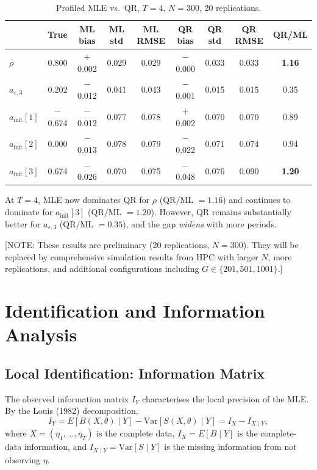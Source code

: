 \documentclass[12pt]{article}
\begin{document}
\begin{table}[H]
\centering
\caption{Profiled MLE vs.\ QR, $T = 4$, $N = 300$, 20 replications.}
\label{tab:profiled_T4}
\begin{tabular}{lcccccccc}
\toprule
 & True & ML bias & ML std & ML RMSE & QR bias & QR std & QR RMSE & QR/ML \\
\midrule
$\rho$       & 0.800 & $+$0.002 & 0.029 & 0.029 & $-$0.000 & 0.033 & 0.033 & \textbf{1.16} \\
$a_{\varepsilon,3}$ & 0.202 & $-$0.012 & 0.041 & 0.043 & $-$0.001 & 0.015 & 0.015 & 0.35 \\
$a_{\text{init}}[1]$ & $-$0.674 & $-$0.012 & 0.077 & 0.078 & $+$0.002 & 0.070 & 0.070 & 0.89 \\
$a_{\text{init}}[2]$ & 0.000 & $-$0.013 & 0.078 & 0.079 & $-$0.022 & 0.071 & 0.074 & 0.94 \\
$a_{\text{init}}[3]$ & 0.674 & $-$0.026 & 0.070 & 0.075 & $-$0.048 & 0.076 & 0.090 & \textbf{1.20} \\
\bottomrule
\end{tabular}
\end{table}

\noindent
At $T = 4$, MLE now dominates QR for $\rho$ (QR/ML $= 1.16$) and continues
to dominate for $a_{\text{init}}[3]$ (QR/ML $= 1.20$).
However, QR remains substantially better for $a_{\varepsilon,3}$
(QR/ML $= 0.35$), and the gap \emph{widens} with more periods.

\textcolor{myred}{[NOTE: These results are preliminary (20 replications, $N = 300$).
They will be replaced by comprehensive simulation results from HPC
with larger $N$, more replications, and additional configurations including
$G \in \{201, 501, 1001\}$.]}

\section{Identification and Information Analysis}
\label{sec:identification}

\subsection{Local Identification: Information Matrix}

The observed information matrix $I_Y$ characterises the local precision of
the MLE.
By the Louis (1982) decomposition,
\begin{equation}\label{eq:louis}
I_Y = E[B(X,\theta) \mid Y] - \text{Var}[S(X,\theta) \mid Y]
    = I_X - I_{X \mid Y},
\end{equation}
where $X = (\eta_1, \ldots, \eta_T)$ is the complete data,
$I_X = E[B \mid Y]$ is the complete-data information, and
$I_{X \mid Y} = \text{Var}[S \mid Y]$ is the missing information from
not observing $\eta$.
\end{document}
